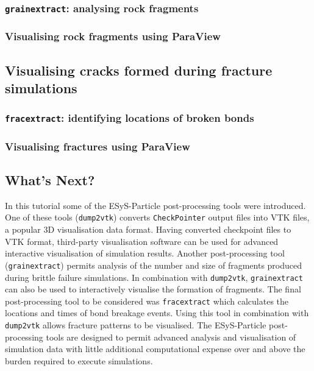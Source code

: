 \subsubsection{\texttt{grainextract}: analysing rock fragments}

\subsubsection{Visualising rock fragments using ParaView}

\subsection{Visualising cracks formed during fracture simulations}

\subsubsection{\texttt{fracextract}: identifying locations of broken bonds}

\subsubsection{Visualising fractures using ParaView}

\subsection*{What's Next?}

In this tutorial some of the ESyS-Particle post-processing tools were introduced. One of these tools (\texttt{dump2vtk}) converts \texttt{CheckPointer} output files into VTK files, a popular 3D visualisation data format. Having converted checkpoint files to VTK format, third-party visualisation software can be used for advanced interactive visualisation of simulation results. Another post-processing tool (\texttt{grainextract}) permits analysis of the number and size of fragments produced during brittle failure simulations. In combination with \texttt{dump2vtk}, \texttt{grainextract} can also be used to interactively visualise the formation of fragments. The final post-processing tool to be considered was \texttt{fracextract} which calculates the locations and times of bond breakage events. Using this tool in combination with \texttt{dump2vtk} allows fracture patterns to be visualised. The ESyS-Particle post-processing tools are designed to permit advanced analysis and visualisation of simulation data with 
little additional computational expense over and above the burden required to execute simulations.

